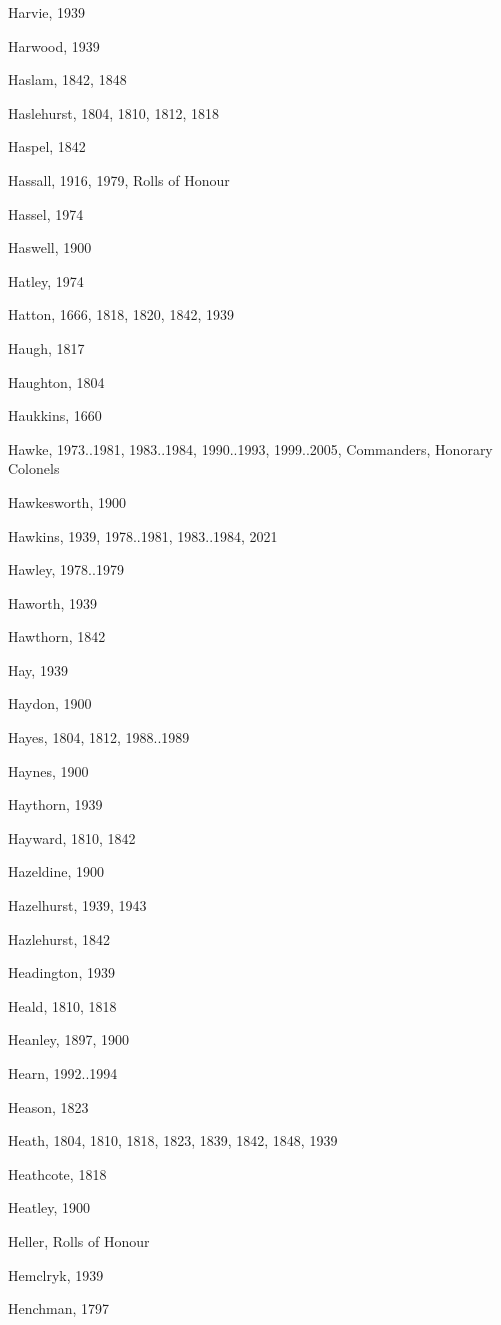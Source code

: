 {\begin{theindex}
\item Harvie, 1939
\item Harwood, 1939
\item Haslam, 1842, 1848
\item Haslehurst, 1804, 1810, 1812, 1818
\item Haspel, 1842
\item Hassall, 1916, 1979, Rolls of Honour
\item Hassel, 1974
\item Haswell, 1900
\item Hatley, 1974
\item Hatton, 1666, 1818, 1820, 1842, 1939
\item Haugh, 1817
\item Haughton, 1804
\item Haukkins, 1660
\item Hawke, 1973..1981, 1983..1984, 1990..1993, 1999..2005, Commanders, Honorary Colonels
\item Hawkesworth, 1900
\item Hawkins, 1939, 1978..1981, 1983..1984, 2021
\item Hawley, 1978..1979
\item Haworth, 1939
\item Hawthorn, 1842
\item Hay, 1939
\item Haydon, 1900
\item Hayes, 1804, 1812, 1988..1989
\item Haynes, 1900
\item Haythorn, 1939
\item Hayward, 1810, 1842
\item Hazeldine, 1900
\item Hazelhurst, 1939, 1943
\item Hazlehurst, 1842
\item Headington, 1939
\item Heald, 1810, 1818
\item Heanley, 1897, 1900
\item Hearn, 1992..1994
\item Heason, 1823
\item Heath, 1804, 1810, 1818, 1823, 1839, 1842, 1848, 1939
\item Heathcote, 1818
\item Heatley, 1900
\item Heller, Rolls of Honour
\item Hemclryk, 1939
\item Henchman, 1797

\end{theindex}}
